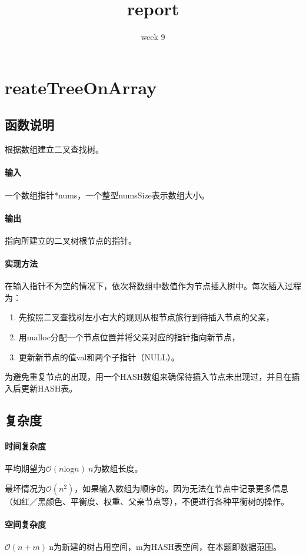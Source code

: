 \documentclass{homework}
\title{report}
\subtitle{week 9}
\begin{document}
\maketitle
\section{reateTreeOnArray}
\subsection{函数说明}
根据数组建立二叉查找树。
\paragraph{输入}
一个数组指针*nums，一个整型numsSize表示数组大小。
\paragraph{输出}
指向所建立的二叉树根节点的指针。
\paragraph{实现方法}
在输入指针不为空的情况下，依次将数组中数值作为节点插入树中。每次插入过程为：
\begin{enumerate}
    \item 先按照二叉查找树左小右大的规则从根节点旅行到待插入节点的父亲，
    \item 用malloc分配一个节点位置并将父亲对应的指针指向新节点，
    \item 更新新节点的值val和两个子指针（NULL）。
\end{enumerate}
为避免重复节点的出现，用一个HASH数组来确保待插入节点未出现过，并且在插入后更新HASH表。
\subsection{复杂度}
\paragraph{时间复杂度}
平均期望为$\mathcal{O}(n\mathrm{log}n) ~ n$为数组长度。

最坏情况为$\mathcal{O}(n^2)$，如果输入数组为顺序的。因为无法在节点中记录更多信息（如红／黑颜色、平衡度、权重、父亲节点等），不便进行各种平衡树的操作。
\paragraph{空间复杂度}
$\mathcal{O}(n+m)~$n为新建的树占用空间，m为HASH表空间，在本题即数据范围。
\end{document}
